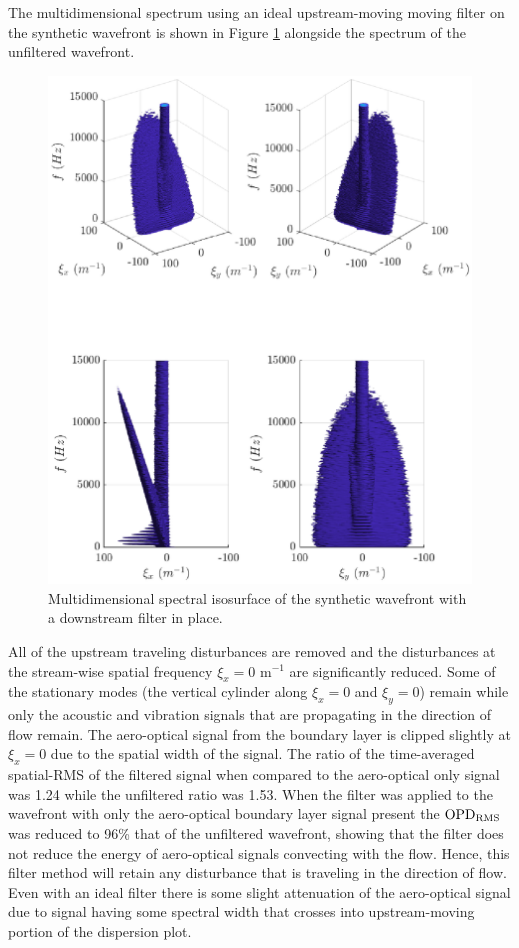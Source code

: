 The multidimensional spectrum using an ideal upstream-moving moving filter on the synthetic wavefront is shown in Figure \ref{fig:06_filter_downstream} alongside the spectrum of the unfiltered wavefront.
\begin{figure}
 \centering
 \includegraphics{../matlab/06_single_sensor_filtering/filter_downstream.eps}
 \caption{Multidimensional spectral isosurface of the synthetic wavefront with a downstream filter in place.}
 \label{fig:06_filter_downstream}
\end{figure}
All of the upstream traveling disturbances are removed and the disturbances at the stream-wise spatial frequency $\xi_x=0$ m$^{-1}$ are significantly reduced.
Some of the stationary modes (the vertical cylinder along $\xi_x=0$ and $\xi_y=0$) remain while only the acoustic and vibration signals that are propagating in the direction of flow remain.
The aero-optical signal from the boundary layer is clipped slightly at $\xi_x=0$ due to the spatial width of the signal.
The ratio of the time-averaged spatial-RMS of the filtered signal when compared to the aero-optical only signal was 1.24 while the unfiltered ratio was 1.53.
When the filter was applied to the wavefront with only the aero-optical boundary layer signal present the $\operatorname{OPD_{RMS}}$ was reduced to 96\% that of the unfiltered wavefront, showing that the filter does not reduce the energy of aero-optical signals convecting with the flow.
Hence, this filter method will retain any disturbance that is traveling in the direction of flow.
Even with an ideal filter there is some slight attenuation of the aero-optical signal due to signal having some spectral width that crosses into upstream-moving portion of the dispersion plot.


